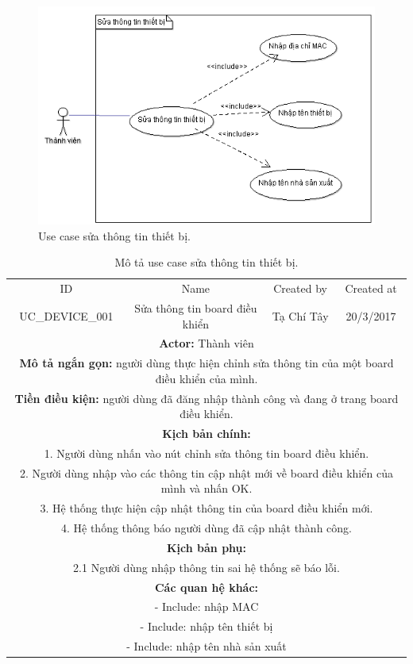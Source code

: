 \documentclass[a4paper,12pt,oneside]{article}
\begin{document}
\begin{figure}[htp]
\centering
\includegraphics[scale=.9]{hinh/stttb.png}
\caption{Use case sửa thông tin thiết bị.}
\end{figure}

\begin{table}[!htp]
\centering
\begin{tabularx}{\linewidth}{ |c||c|c|c| }
\hline
ID & Name & Created by & Created at\\
UC\_DEVICE\_001 & Sửa thông tin board điều khiển & Tạ Chí Tây & 20/3/2017\\
\hline
\multicolumn{4}{|X|}{\textbf{Actor:} Thành viên }\\
\hline
\multicolumn{4}{|X|}{\textbf{Mô tả ngắn gọn:} người dùng thực hiện chỉnh sửa thông tin của một board điều khiển của mình. }\\
\hline
\multicolumn{4}{|X|}{\textbf{Tiền điều kiện:} người dùng đã đăng nhập thành công và đang ở trang board điều khiển.}\\
\hline
\multicolumn{4}{|X|}{\textbf{Kịch bản chính:}}\\
\multicolumn{4}{|X|}{1. Người dùng nhấn vào nút chỉnh sửa thông tin board điều khiển.}\\
\multicolumn{4}{|X|}{ 
2.	Người dùng nhập vào các thông tin cập nhật mới về board điều khiển của mình và nhấn OK.}\\
\multicolumn{4}{|X|}{
3.	Hệ thống thực hiện cập nhật thông tin của board điều khiển mới.}\\

\multicolumn{4}{|X|}{4. Hệ thống thông báo người dùng đã cập nhật thành công.}\\
\hline
\multicolumn{4}{|X|}{\textbf{Kịch bản phụ:}}\\
\multicolumn{4}{|X|}{2.1    Người dùng nhập thông tin sai hệ thống sẽ báo lỗi.}\\
\hline
\multicolumn{4}{|X|}{\textbf{Các quan hệ khác:}}\\
\multicolumn{4}{|X|}{- Include: nhập MAC}\\
\multicolumn{4}{|X|}{- Include: nhập tên thiết bị}\\
\multicolumn{4}{|X|}{- Include: nhập tên nhà sản xuất}\\
\hline

\end{tabularx}
\caption{Mô tả use case sửa thông tin thiết bị.}
\end{table}
\end{document}
